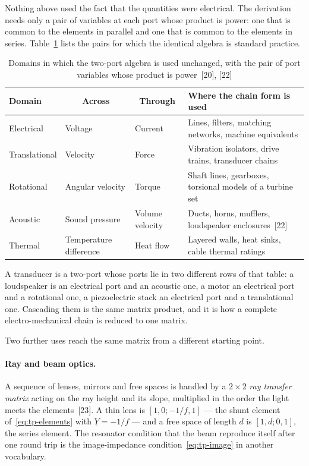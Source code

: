 Nothing above used the fact that the quantities were electrical. The
derivation needs only a pair of variables at each port whose product is
power: one that is common to the elements in parallel and one that is common
to the elements in series. Table~\ref{tab:tp-domains} lists the pairs for
which the identical algebra is standard practice.

\begin{table}[!ht]
  \centering
  \begin{tabularx}{\linewidth}{@{}l l l X@{}}
    \toprule
    \textbf{Domain} & \multicolumn{1}{c}{\textbf{Across}}
      & \multicolumn{1}{c}{\textbf{Through}} & \textbf{Where the chain form is used} \\
    \midrule
    Electrical & Voltage & Current
      & Lines, filters, matching networks, machine equivalents \\
    Translational & Velocity & Force
      & Vibration isolators, drive trains, transducer chains \\
    Rotational & Angular velocity & Torque
      & Shaft lines, gearboxes, torsional models of a turbine set \\
    Acoustic & Sound pressure & Volume velocity
      & Ducts, horns, mufflers, loudspeaker enclosures~[22] \\
    Thermal & Temperature difference & Heat flow
      & Layered walls, heat sinks, cable thermal ratings \\
    \bottomrule
  \end{tabularx}
  \caption{Domains in which the two-port algebra is used unchanged, with the
           pair of port variables whose product is power~[20], [22]}
  \label{tab:tp-domains}
\end{table}

A transducer is a two-port whose ports lie in two different rows of that
table: a loudspeaker is an electrical port and an acoustic one, a motor
an electrical port and a rotational one, a piezoelectric stack an electrical
port and a translational one. Cascading them is the same matrix product, and
it is how a complete electro-mechanical chain is reduced to one matrix.

Two further uses reach the same matrix from a different starting point.

\paragraph{Ray and beam optics.} A sequence of lenses, mirrors and free
spaces is handled by a $2 \times 2$ \emph{ray transfer matrix} acting on the
ray height and its slope, multiplied in the order the light meets the
elements~[23]. A thin lens is $\left[1, 0; -1/f, 1\right]$ --- the shunt
element of~\eqref{eq:tp-elements} with $\underline{Y} = -1/f$ --- and a free
space of length $d$ is $\left[1, d; 0, 1\right]$, the series element. The
resonator condition that the beam reproduce itself after one round trip is
the image-impedance condition~\eqref{eq:tp-image} in another vocabulary.

